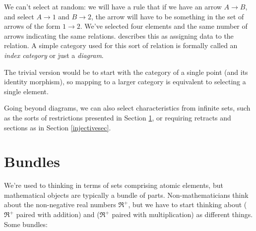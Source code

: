 \documentclass[11pt]{article}
\begin{document}

We can't select at random: we will have a rule that if we have an arrow $A\to B$, and
select $A\to 1$ and $B\to 2$, the arrow will have to be something in the set of arrows
of the form $1\to 2$. We've
selected four elements and the same number of arrows indicating the same relations.
\citet{leinster:basic} describes this as assigning data to the relation. A simple category
used for this sort of relation is formally called an {\em index category} or just a {\em diagram}. \label{diagramref}

The trivial version would be to start with the category of a single point (and its
identity morphism), so mapping to a larger category is equivalent to selecting a single
element.

Going beyond diagrams, we can also select characteristics from infinite sets,
such as the sorts of restrictions presented in Section
\ref{bundlesec}, or requiring retracts and sections as in Section \ref{injectivesec}.

\section{Bundles}\label{bundlesec}
We're used to thinking in terms of sets comprising atomic elements, but mathematical
objects are typically a bundle of parts. Non-mathematicians think about the non-negative real numbers
$\Re^+$, but we have to start thinking about ($\Re^+$ paired with addition) and ($\Re^+$
paired with multiplication) as different things. Some bundles:

\end{document}
